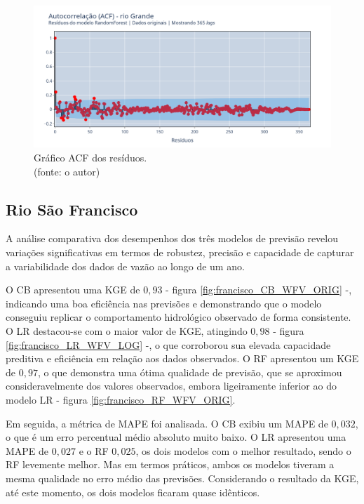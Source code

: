 \begin{figure}[!h]
	\centering
	\includegraphics[scale=0.33]{Figuras/rio_grande/wfv/RF/RF_WFV_ORIG_RESID_ACF.png}
	\caption{Gráfico ACF dos resíduos.\\(fonte: o autor)}
	\label{fig:grande_RF_WFV_ORIG_RESID_ACF}
\end{figure}
\clearpage

\subsection{Rio São Francisco}

A análise comparativa dos desempenhos dos três modelos de previsão revelou variações significativas em termos de robustez, precisão e capacidade de capturar a variabilidade dos dados de vazão ao longo de um ano.

O CB apresentou uma KGE de $0,93$ - figura \ref{fig:francisco_CB_WFV_ORIG} -, indicando uma boa eficiência nas previsões e demonstrando que o modelo conseguiu replicar o comportamento hidrológico observado de forma consistente. O LR destacou-se com o maior valor de KGE, atingindo $0,98$ - figura \ref{fig:francisco_LR_WFV_LOG} -, o que corroborou sua elevada capacidade preditiva e eficiência em relação aos dados observados. O RF apresentou um KGE de $0,97$, o que demonstra uma ótima qualidade de previsão, que se aproximou consideravelmente dos valores observados, embora ligeiramente inferior ao do modelo LR - figura \ref{fig:francisco_RF_WFV_ORIG}.

Em seguida, a métrica de MAPE foi analisada. O CB exibiu um MAPE de $0,032$, o que é um erro percentual médio absoluto muito baixo. O LR apresentou uma MAPE de $0,027$ e o RF $0,025$, os dois modelos com o melhor resultado, sendo o RF levemente melhor. Mas em termos práticos, ambos os modelos tiveram a mesma qualidade no erro médio das previsões. Considerando o resultado da KGE, até este momento, os dois modelos ficaram quase idênticos.

